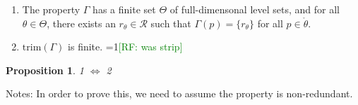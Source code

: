 \documentclass[12pt]{article}
\newcommand{\Comments}{1}
\newcommand{\mynote}[2]{\ifnum\Comments=1\textcolor{#1}{#2}\fi}
\newcommand{\raf}[1]{\mynote{green}{[RF: #1]}}
\newcommand{\R}{\mathcal{R}}
\newcommand{\inter}[1]{\mathring{#1}}%
\newcommand{\trim}{\mathrm{trim}}
\newtheorem{proposition}{Proposition}
\begin{document}
\begin{enumerate}
\item The property $\Gamma$ has a finite set $\Theta$ of full-dimensonal level sets, and for all $\theta \in \Theta$, there exists an $r_\theta \in \R$ such that $\Gamma(p) = \{r_\theta\}$ for all $p \in \inter{\theta}$.
\item $\trim(\Gamma)$ is finite.  \raf{was strip}
\end{enumerate}

\begin{proposition}\label{prop:optimal-reports-per-level-set}
1 $\iff$ 2
\end{proposition}



Notes:
In order to prove this, we need to assume the property is non-redundant.
\end{document}
